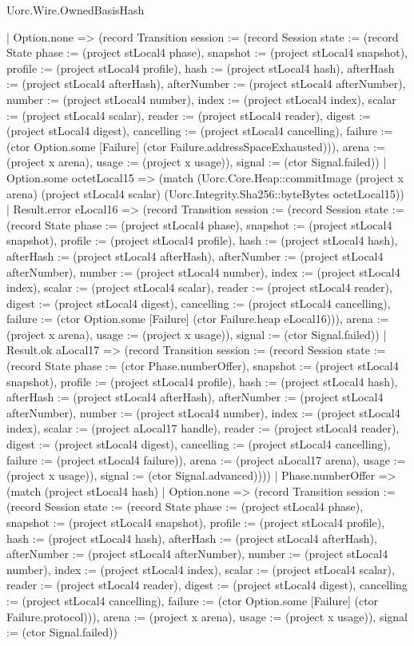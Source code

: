 \begin{lexlean}{Uorc.Wire.OwnedBasisHash}
\begin{semanticmodule}
{        | Option.none => (record Transition {session := (record Session {state := (record State {phase := (project stLocal4 phase), snapshot := (project stLocal4 snapshot), profile := (project stLocal4 profile), hash := (project stLocal4 hash), afterHash := (project stLocal4 afterHash), afterNumber := (project stLocal4 afterNumber), number := (project stLocal4 number), index := (project stLocal4 index), scalar := (project stLocal4 scalar), reader := (project stLocal4 reader), digest := (project stLocal4 digest), cancelling := (project stLocal4 cancelling), failure := (ctor Option.some [Failure] (ctor Failure.addressSpaceExhausted))}), arena := (project x arena), usage := (project x usage)}), signal := (ctor Signal.failed)})
        | Option.some octetLocal15 => (match (Uorc.Core.Heap::commitImage (project x arena) (project stLocal4 scalar) (Uorc.Integrity.Sha256::byteBytes octetLocal15))
          | Result.error eLocal16 => (record Transition {session := (record Session {state := (record State {phase := (project stLocal4 phase), snapshot := (project stLocal4 snapshot), profile := (project stLocal4 profile), hash := (project stLocal4 hash), afterHash := (project stLocal4 afterHash), afterNumber := (project stLocal4 afterNumber), number := (project stLocal4 number), index := (project stLocal4 index), scalar := (project stLocal4 scalar), reader := (project stLocal4 reader), digest := (project stLocal4 digest), cancelling := (project stLocal4 cancelling), failure := (ctor Option.some [Failure] (ctor Failure.heap eLocal16))}), arena := (project x arena), usage := (project x usage)}), signal := (ctor Signal.failed)})
          | Result.ok aLocal17 => (record Transition {session := (record Session {state := (record State {phase := (ctor Phase.numberOffer), snapshot := (project stLocal4 snapshot), profile := (project stLocal4 profile), hash := (project stLocal4 hash), afterHash := (project stLocal4 afterHash), afterNumber := (project stLocal4 afterNumber), number := (project stLocal4 number), index := (project stLocal4 index), scalar := (project aLocal17 handle), reader := (project stLocal4 reader), digest := (project stLocal4 digest), cancelling := (project stLocal4 cancelling), failure := (project stLocal4 failure)}), arena := (project aLocal17 arena), usage := (project x usage)}), signal := (ctor Signal.advanced)})))
      | Phase.numberOffer => (match (project stLocal4 hash)
        | Option.none => (record Transition {session := (record Session {state := (record State {phase := (project stLocal4 phase), snapshot := (project stLocal4 snapshot), profile := (project stLocal4 profile), hash := (project stLocal4 hash), afterHash := (project stLocal4 afterHash), afterNumber := (project stLocal4 afterNumber), number := (project stLocal4 number), index := (project stLocal4 index), scalar := (project stLocal4 scalar), reader := (project stLocal4 reader), digest := (project stLocal4 digest), cancelling := (project stLocal4 cancelling), failure := (ctor Option.some [Failure] (ctor Failure.protocol))}), arena := (project x arena), usage := (project x usage)}), signal := (ctor Signal.failed)})
}
\end{semanticmodule}
\end{lexlean}
